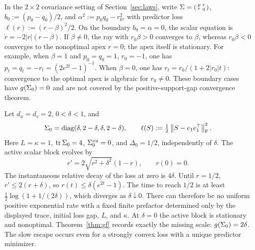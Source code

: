 \begin{remark}\label{rem:degenerate-boundary-leaves}
In the $2\times2$ covariance setting of Section~\ref{sec:laws}, write
$\Sigma=\begin{psmallmatrix}p&r\\r&q\end{psmallmatrix}$,
$b_0:=(p_0-q_0)/2$, and $\alpha^2:=p_0q_0-r_0^2$,
with predictor loss $\ell(r):=(r-\beta)^2/2$.
On the boundary \(b_0=\alpha=0\), the scalar equation is
\(\dot r=-2|r|(r-\beta)\).
If \(\beta\ne0\), the ray with \(r_0\beta>0\) converges to \(\beta\),
whereas \(r_0\beta<0\) converges to the nonoptimal apex \(r=0\);
the apex itself is stationary. For example, when \(\beta=1\) and
\(p_0=q_0=1\), \(r_0=-1\), one has
\(p_t=q_t=-r_t=(2e^{2t}-1)^{-1}\).
When \(\beta=0\), one has \(r_t=r_0/(1+2|r_0|t)\): convergence to the
optimal apex is algebraic for \(r_0\ne0\).
These boundary cases have $g(\Sigma_0)=0$ and are not covered by the
positive-support-gap convergence theorem.
\end{remark}

\begin{example}\label{ex:slow}
Let $d_u=d_v=2$, $0<\delta<1$, and
\[
 \Sigma_0=\operatorname{diag}(\delta,2-\delta,\delta,2-\delta),\qquad
 \ell(S):=\tfrac12\left\lVert S-e_1e_1^\top \right\rVert_{\mathrm{F}}^2.
\]
Here $L=\kappa=1$, $\operatorname{tr}\Sigma_0=4$, $\Sigma^{vu}_0=0$, and $\Delta_0=1/2$,
independently of $\delta$. The active scalar block evolves by
\[
 r'=2\sqrt{r^2+\delta^2}(1-r),\qquad r(0)=0.
\]
The instantaneous relative decay of the loss at zero is $4\delta$.
Until $r=1/2$, $r'\le2(r+\delta)$, so
$r(t)\le\delta(e^{2t}-1)$. The time to reach $1/2$ is at least
$\tfrac12\log(1+1/(2\delta))$, which diverges as $\delta\downarrow0$.
There can therefore be no uniform positive exponential rate with a fixed
finite prefactor determined only by the displayed trace, initial loss gap, $L$, and
$\kappa$. At $\delta=0$ the active block is stationary and nonoptimal.
Theorem~\ref{thm:gf} records exactly the missing scale: $g(\Sigma_0)=2\delta$.
The slow escape occurs even for a strongly convex loss with a unique
predictor minimizer.
\end{example}


